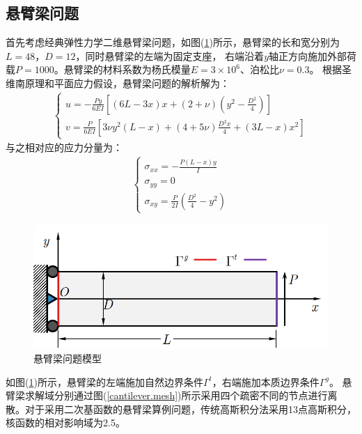 \subsection{悬臂梁问题}
首先考虑经典弹性力学二维悬臂梁问题，如图(\ref{cantilever})所示，悬臂梁的长和宽分别为$L=48$，$D=12$，同时悬臂梁的左端为固定支座，
右端沿着$y$轴正方向施加外部荷载$P=1000$。悬臂梁的材料系数为杨氏模量$E=3\times10^6$、泊松比$\nu=0.3$。
根据圣维南原理和平面应力假设，悬臂梁问题的解析解为：
\begin{equation}
\begin{split}
\begin{cases}
    u = -\frac{Py}{6EI}[(6L-3x)x + (2+\nu)(y^2 - \frac{D^2}{4})] \\
    v = \frac{P}{6EI}[3\nu y^2(L-x) + (4+5\nu)\frac{D^2x}{4} + (3L-x)x^2]
\end{cases}
\end{split}
\end{equation}
与之相对应的应力分量为：
\begin{equation}
\begin{split}
\begin{cases}
   \sigma_{xx}=-\frac{P(L-x)y}{I}\\
   \sigma_{yy}=0\\
   \sigma_{xy}=\frac{P}{2I}(\frac{D^2}{4}-y^2)
\end{cases}
\end{split}
\end{equation}
\begin{figure}[H]
    \centering
    \includegraphics[scale=0.7]{figure/EHR/cantilever/cantilever.png}
    \caption{悬臂梁问题模型}\label{cantilever}
\end{figure}
如图(\ref{cantilever})所示，悬臂梁的左端施加自然边界条件$\Gamma^t$，右端施加本质边界条件$\Gamma^g$。
悬臂梁求解域分别通过图(\ref{cantilever.mesh})所示采用四个疏密不同的节点进行离散。对于采用二次基函数的悬臂梁算例问题，传统高斯积分法采用13点高斯积分，核函数的相对影响域为2.5。
